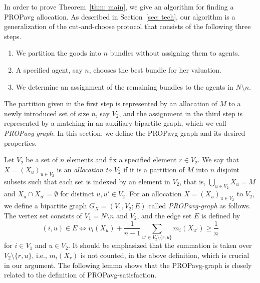 \documentclass[11pt]{article}
\newcommand{\PROPavg}{\textsf{PROPavg}\xspace}
\begin{document}
In order to prove Theorem~\ref{thm: main}, 
we give an algorithm for finding a \PROPavg allocation. 
As described in Section~\ref{sec: tech}, our algorithm is a generalization of the cut-and-choose protocol that consists of the following three steps. 
\begin{enumerate}
\item
We partition the goods into $n$ bundles without assigning them to agents. 
\item 
A specified agent, say $n$, chooses the best bundle for her valuation.  
\item
We determine an assignment of the remaining bundles to the agents in $N \setminus n$. 
\end{enumerate}
The partition given in the first step is represented by an allocation of $M$ to a newly introduced set of size $n$, say $V_2$, and 
the assignment in the third step is represented by a matching in an auxiliary bipartite graph, which we call {\it \PROPavg-graph}. 
In this section, we define the \PROPavg-graph and its desired properties. 

Let $V_2$ be a set of $n$ elements and fix a specified element $r \in V_2$. 
We say that $X=(X_u)_{u\in V_2}$ is an {\it allocation to $V_2$} if it is a partition of $M$ into $n$ disjoint subsets such that each set is indexed by an element in $V_2$, that is,  
$\bigcup_{u \in V_2} X_u = M$ and $X_u \cap X_{u'} = \emptyset$ for distinct $u, u' \in V_2$. 
For an allocation $X=(X_u)_{u\in V_2}$ to $V_2$, we define a bipartite graph $G_{X}=(V_1, V_2; E)$ called {\it \PROPavg-graph} as follows. 
The vertex set consists of $V_1 = N \setminus n$ and $V_2$, and the edge set $E$ is defined by
$$
(i,u) \in E \iff v_i(X_u)+\frac{1}{n-1}\sum_{u'\in V_2 \setminus \{r, u\}} m_i(X_{u'}) \ge \frac{1}{n}
$$
for $i \in V_1$ and $u \in V_2$. 
It should be emphasized that the summation is taken over $V_2 \setminus \{r, u\}$, i.e., $m_i(X_{r})$ is not  counted, in the above definition, which is crucial in our argument. 
The following lemma shows that the \PROPavg-graph is closely related to the definition of \PROPavg-satisfaction. 
\end{document}
